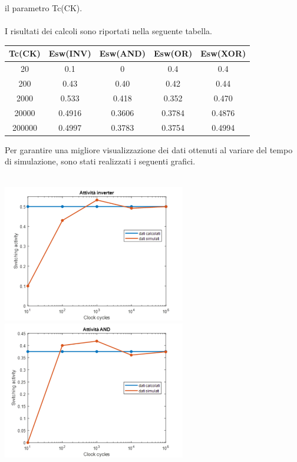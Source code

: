 \documentclass[11pt,  english, makeidx, a4paper, titlepage, oneside]{book}
\begin{document}
il parametro Tc(CK).
\\\\
I risultati dei calcoli sono riportati nella seguente tabella. 
\\
\begin{center}
	\begin{tabular}{|c|c|c|c|c|}
	\hline
	Tc(CK) & Esw(INV) & Esw(AND) & Esw(OR) & Esw(XOR) \\ 
	\hline
	20 & 0.1 & 0 & 0.4 & 0.4 \\
	\hline
	200 & 0.43 & 0.40 & 0.42 & 0.44 \\
	\hline
	2000 & 0.533 & 0.418 & 0.352 & 0.470 \\
	\hline
	20000 & 0.4916 & 0.3606 & 0.3784 & 0.4876 \\
	\hline
	200000 & 0.4997 & 0.3783 & 0.3754 & 0.4994 \\
	\hline
	\end{tabular}
\end{center}
\vspace{1cm}
Per garantire una migliore visualizzazione dei dati ottenuti 
al variare del tempo di simulazione, sono stati realizzati 
i seguenti grafici.
\\\\
\centerline{\includegraphics[width=8cm]{./img/Lab_1/Es_1/Inverter.png}
            \includegraphics[width=8cm]{./img/Lab_1/Es_1/AND.png}}
\end{document}
